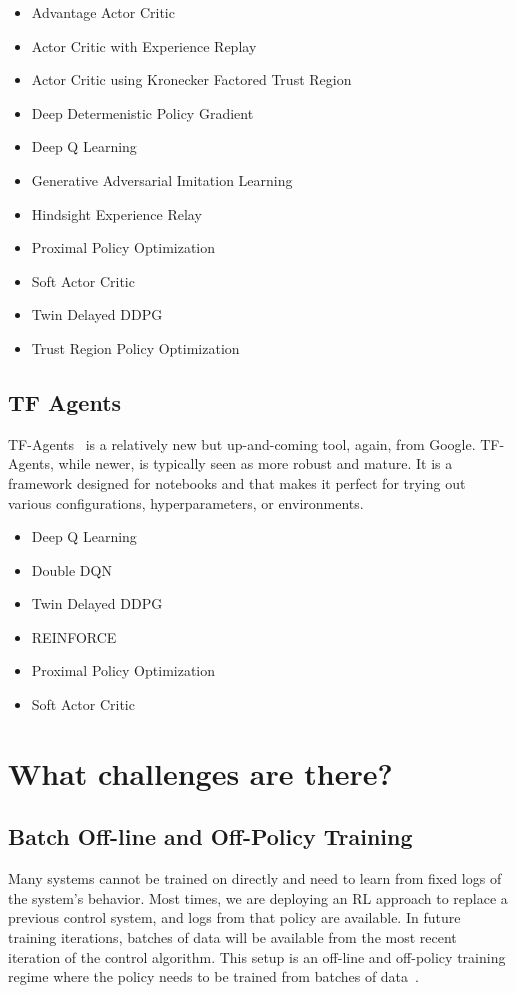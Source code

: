 \documentclass[letterpaper, 10 pt]{IEEEconf}
\begin{document}
\begin{itemize}
	\item Advantage Actor Critic
	\item Actor Critic with Experience Replay
	\item Actor Critic using Kronecker Factored Trust Region
	\item Deep Determenistic Policy Gradient
	\item Deep Q Learning
	\item Generative Adversarial Imitation Learning
	\item Hindsight Experience Relay
	\item Proximal Policy Optimization
	\item Soft Actor Critic
	\item Twin Delayed DDPG
	\item Trust Region Policy Optimization
\end{itemize}

\subsection{TF Agents}

TF-Agents~\cite{TFAgents} is a relatively new but up-and-coming tool, again, from
Google.  TF-Agents, while newer, is typically seen as more robust and
mature. It is a framework designed for notebooks and that makes it
perfect for trying out various configurations, hyperparameters, or
environments.

\begin{itemize}
	\item Deep Q Learning
	\item Double DQN
	\item Twin Delayed DDPG
	\item REINFORCE
	\item Proximal Policy Optimization
	\item Soft Actor Critic
\end{itemize}

\section{What challenges are there?}

\subsection{Batch Off-line and Off-Policy Training}

Many systems cannot be trained on directly and need to learn from
fixed logs of the system’s behavior. Most times, we are deploying an
RL approach to replace a previous control system, and logs from that
policy are available. In future training iterations, batches of data
will be available from the most recent iteration of the control
algorithm. This setup is an off-line and off-policy training regime
where the policy needs to be trained from batches of data~\cite{deepmind2019}.
\end{document}
